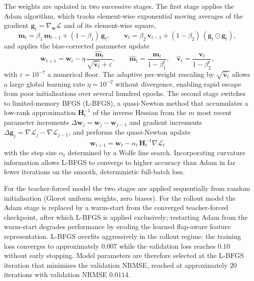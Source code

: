 The weights are updated in two successive stages. The first stage applies the Adam
algorithm, which tracks element-wise exponential moving averages of the gradient
$\mathbf{g}_t = \nabla_\mathbf{w}\mathcal{L}$ and of its element-wise square,
\begin{equation}
  \mathbf{m}_t = \beta_1\,\mathbf{m}_{t-1} + (1-\beta_1)\,\mathbf{g}_t, \qquad
  \mathbf{v}_t = \beta_2\,\mathbf{v}_{t-1} + (1-\beta_2)\,(\mathbf{g}_t \odot \mathbf{g}_t),
\label{eq:adam_moments}
\end{equation}
and applies the bias-corrected parameter update
\begin{equation}
  \mathbf{w}_{t+1} = \mathbf{w}_t
      - \eta\,\frac{\hat{\mathbf{m}}_t}{\sqrt{\hat{\mathbf{v}}_t}+\varepsilon},
  \qquad
  \hat{\mathbf{m}}_t = \frac{\mathbf{m}_t}{1-\beta_1^t}, \quad
  \hat{\mathbf{v}}_t = \frac{\mathbf{v}_t}{1-\beta_2^t},
\label{eq:adam}
\end{equation}
with $\varepsilon = 10^{-7}$ a numerical floor. The adaptive per-weight rescaling by
$\sqrt{\hat{\mathbf{v}}_t}$ allows a large global learning rate $\eta = 10^{-2}$ without
divergence, enabling rapid escape from poor initialisations over several hundred epochs.
The second stage switches to limited-memory BFGS (L-BFGS), a quasi-Newton method that
accumulates a low-rank approximation $\mathbf{H}_t^{-1}$ of the inverse Hessian from the
$m$ most recent parameter increments $\Delta\mathbf{w}_j = \mathbf{w}_j - \mathbf{w}_{j-1}$
and gradient increments $\Delta\mathbf{g}_j = \nabla\mathcal{L}_j - \nabla\mathcal{L}_{j-1}$,
and performs the quasi-Newton update
\begin{equation}
  \mathbf{w}_{t+1} = \mathbf{w}_t - \alpha_t\,\mathbf{H}_t^{-1}\nabla\mathcal{L}_t
\label{eq:lbfgs}
\end{equation}
with the step size $\alpha_t$ determined by a Wolfe line search. Incorporating curvature
information allows L-BFGS to converge to higher accuracy than Adam in far fewer iterations
on the smooth, deterministic full-batch loss.

For the teacher-forced model the two stages are applied sequentially from random
initialisation (Glorot uniform weights, zero biases). For the rollout model the Adam stage
is replaced by a warm-start from the converged teacher-forced checkpoint, after which
L-BFGS is applied exclusively; restarting Adam from the warm-start degrades performance by
eroding the learned flap-aware feature representation. L-BFGS overfits aggressively in the
rollout regime: the training loss converges to approximately $0.007$ while the validation
loss reaches $0.10$ without early stopping. Model parameters are therefore selected at the
L-BFGS iteration that minimises the validation NRMSE, reached at approximately 20
iterations with validation NRMSE $0.0114$.

